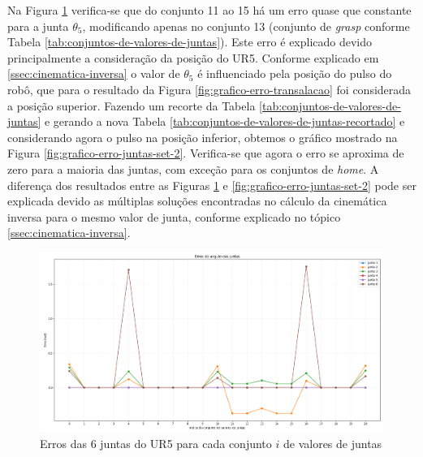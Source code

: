 Na Figura \ref{fig:grafico-erro-juntas} verifica-se que do
conjunto 11 ao 15 há um erro quase que constante para a junta $\theta_{5}$, modificando apenas no conjunto
13 (conjunto de \textit{grasp} conforme Tabela \ref{tab:conjuntos-de-valores-de-juntas}). Este erro é explicado
devido principalmente a consideração da posição do UR5. Conforme explicado em \ref{ssec:cinematica-inversa} 
o valor de $\theta_{5}$ é influenciado pela posição do pulso do robô, que para o resultado da Figura \ref{fig:grafico-erro-transalacao}
foi considerada a posição superior. Fazendo um recorte da Tabela \ref{tab:conjuntos-de-valores-de-juntas}
e gerando a nova Tabela \ref{tab:conjuntos-de-valores-de-juntas-recortado} e considerando agora o pulso na
posição inferior, obtemos o gráfico mostrado na Figura \ref{fig:grafico-erro-juntas-set-2}. Verifica-se que
agora o erro se aproxima de zero para a maioria das juntas, com exceção para os conjuntos de \textit{home}. A diferença
dos resultados entre as Figuras \ref{fig:grafico-erro-juntas} e \ref{fig:grafico-erro-juntas-set-2} pode ser
explicada devido as múltiplas soluções encontradas no cálculo da cinemática inversa para o mesmo valor de junta,
conforme explicado no tópico \ref{ssec:cinematica-inversa}.

\begin{figure}[htp]
	\centering
	\caption{Erros das 6 juntas do UR5 para cada conjunto $i$ de valores de juntas}
	\label{fig:grafico-erro-juntas}
	\includegraphics[width=\textwidth]{images/erro_do_angulo_das_juntas.png}
\end{figure}

